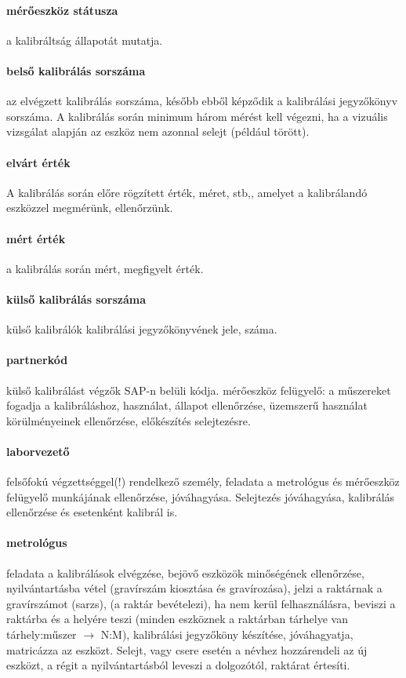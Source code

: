 \documentclass[a4paper,12pt]{report}
\begin{document}
\paragraph*{mérőeszköz státusza} a kalibráltság állapotát mutatja.

\paragraph*{belső kalibrálás sorszáma} az elvégzett kalibrálás sorszáma, később ebből képződik a kalibrálási jegyzőkönyv sorszáma. A kalibrálás során minimum három mérést
kell végezni, ha a vizuális vizsgálat alapján az eszköz nem azonnal selejt (például törött).

\paragraph*{elvárt érték} A kalibrálás során előre rögzített érték, méret, stb,, amelyet a kalibrálandó eszközzel megmérünk, ellenőrzünk.

\paragraph*{mért érték} a kalibrálás során mért, megfigyelt érték.

\paragraph*{külső kalibrálás sorszáma}  külső kalibrálók kalibrálási jegyzőkönyvének
jele, száma.

\paragraph*{partnerkód} külső kalibrálást végzők SAP-n belüli kódja.
mérőeszköz felügyelő:	a műszereket fogadja a kalibráláshoz, használat, állapot 
ellenőrzése, üzemszerű használat körülményeinek ellenőrzése, előkészítés selejtezésre.

\paragraph*{laborvezető}	felsőfokú végzettséggel(!) rendelkező személy, feladata a
metrológus és mérőeszköz felügyelő munkájának ellenőrzése, jóváhagyása. Selejtezés
jóváhagyása, kalibrálás ellenőrzése és esetenként kalibrál is.

\paragraph*{metrológus} feladata a kalibrálások elvégzése, bejövő eszközök
minőségének ellenőrzése, nyilvántartásba vétel (gravírszám kiosztása és gravírozása),
jelzi a raktárnak a gravírszámot (sarzs), (a raktár bevételezi), ha nem kerül felhasználásra, 
beviszi a raktárba és a helyére teszi (minden eszköznek a raktárban tárhelye van
tárhely:műszer $\rightarrow$ N:M), kalibrálási jegyzőköny készítése, jóváhagyatja, matricázza az eszközt. Selejt, vagy csere esetén a névhez hozzárendeli az új eszközt, a régit a nyilvántartásból leveszi a dolgozótól, raktárat értesíti.
\end{document}
